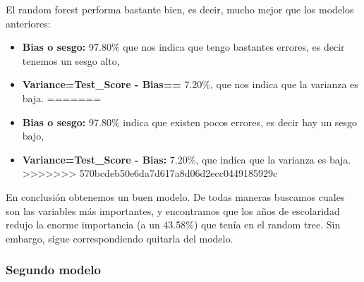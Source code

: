 \documentclass[a4paper]{article}
\begin{document}
             El random forest performa bastante bien, es decir, mucho mejor que los modelos anteriores:
             \begin{itemize}
<<<<<<< HEAD
                \item \textbf{Bias o sesgo:} 97.80\% que nos indica que tengo bastantes errores, es decir tenemos un sesgo alto,
                \item \textbf{Variance=Test\_Score - Bias==} 7.20\%, que nos indica que la varianza es baja.
=======
                \item \textbf{Bias o sesgo:} 97.80\% indica que existen pocos errores, es decir hay un sesgo bajo,
                \item \textbf{Variance=Test\_Score - Bias:} 7.20\%, que indica que la varianza es baja.
>>>>>>> 570bcdeb50e6da7d617a8d06d2ecc0449185929c
             \end{itemize}

             En conclusión obtenemos un buen modelo. De todas maneras buscamos cuales son las variables más importantes, y encontramos que los años de escolaridad redujo la enorme importancia (a un 43.58\%) que tenía en el random tree. Sin embargo, sigue correspondiendo quitarla del modelo.

        \subsubsection{Segundo modelo}
\end{document}
